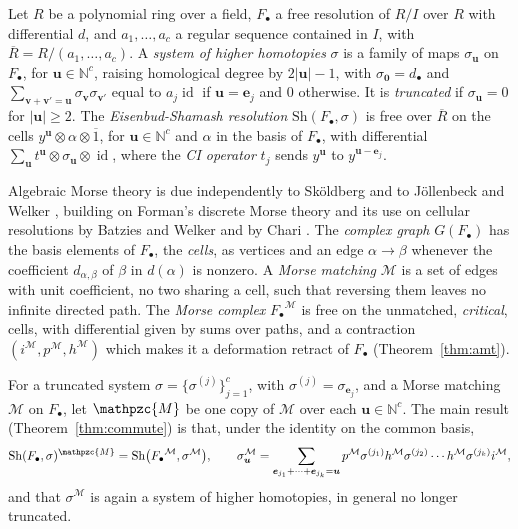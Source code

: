 \documentclass[12pt]{amsart}
\theoremstyle{plain}
\theoremstyle{definition}
\newcommand{\F}{ {F_\bullet} }
\newcommand{\Rbar}{\overline{R}}
\newcommand{\M}{\mathcal{M}}
\newcommand{\lift}[1]{\mathpzc{#1}}
\newcommand{\id}{\operatorname{id}}
\newcommand{\N}{\mathbb{N}}
\newcommand{\Sh}{\mathrm{Sh}}
\begin{document}
Let $R$ be a polynomial ring over a field, $\F$ a free resolution of $R/I$ over $R$ with differential $d$, and $a_1, \dots, a_c$ a regular sequence contained in $I$, with $\Rbar = R/(a_1, \dots, a_c)$. A \emph{system of higher homotopies} $\sigma$ is a family of maps $\sigma_{\boldsymbol{u}}$ on $\F$, for $\boldsymbol{u} \in \N^c$, raising homological degree by $2|\boldsymbol{u}| - 1$, with $\sigma_{\boldsymbol{0}} = d_\bullet$ and $\sum_{\boldsymbol{v} + \boldsymbol{v'} = \boldsymbol{u}} \sigma_{\boldsymbol{v}} \sigma_{\boldsymbol{v'}}$ equal to $a_j \id$ if $\boldsymbol{u} = \boldsymbol{e}_j$ and $0$ otherwise. It is \emph{truncated} if $\sigma_{\boldsymbol{u}} = 0$ for $|\boldsymbol{u}| \ge 2$. The \emph{ Eisenbud-Shamash resolution} $\Sh(\F, \sigma)$ is free over $\Rbar$ on the cells $y^{\boldsymbol{u}} \otimes \alpha \otimes\overline{1}$, for $\boldsymbol{u} \in \N^c$ and $\alpha$ in the basis of $\F$, with differential $\sum_{\boldsymbol{u}} t^{\boldsymbol{u}} \otimes \sigma_{\boldsymbol{u}} \otimes \id$, where the \emph{CI operator} $t_j$ sends $y^{\boldsymbol{u}}$ to $y^{\boldsymbol{u} - \boldsymbol{e}_j}$.

Algebraic Morse theory is due independently to Sk\"oldberg \cite{Skoldberg} and to J\"ollenbeck and Welker \cite{JollenbeckWelker}, building on Forman's discrete Morse theory \cite{Forman} and its use on cellular resolutions by Batzies and Welker \cite{BatziesWelker} and by Chari \cite{Chari}. The \emph{complex graph} $G(\F)$ has the basis elements of $\F$, the \emph{cells}, as vertices and an edge $\alpha \to \beta$ whenever the coefficient $d_{\alpha,\beta}$ of $\beta$ in $d(\alpha)$ is nonzero. A \emph{Morse matching} $\M$ is a set of edges with unit coefficient, no two sharing a cell, such that reversing them leaves no infinite directed path. The \emph{Morse complex} $\F^{\M}$ is free on the unmatched, \emph{critical}, cells, with differential given by sums over paths, and a contraction $(i^{\M}, p^{\M}, h^{\M})$ which makes it a deformation retract of $\F$ (Theorem~\ref{thm:amt}).

For a truncated system $\sigma = \{\sigma^{(j)}\}_{j=1}^c$, with $\sigma^{(j)} = \sigma_{\boldsymbol{e}_j}$, and a Morse matching $\M$ on $\F$, let $\lift{M}$ be one copy of $\M$ over each $\boldsymbol{u} \in \N^c$. The main result (Theorem~\ref{thm:commute}) is that, under the identity on the common basis,
\[
    \Sh(\F, \sigma)^{\lift{M}} = \Sh\bigl(\F^{\M}, \sigma^{\M}\bigr), \qquad \sigma^{\M}_{\boldsymbol{u}} = \sum_{\boldsymbol{e}_{j_1} + \dots + \boldsymbol{e}_{j_k} = \boldsymbol{u}} p^{\M} \sigma^{(j_1)} h^{\M} \sigma^{(j_2)} \cdots h^{\M} \sigma^{(j_k)} i^{\M},
\]
and that $\sigma^{\M}$ is again a system of higher homotopies, in general no longer truncated.
\end{document}
